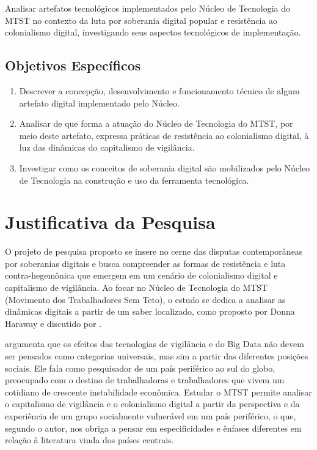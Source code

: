 Analisar artefatos tecnológicos implementados pelo Núcleo de Tecnologia do MTST no contexto da luta por soberania digital popular e resistência ao colonialismo digital, investigando seus aspectos tecnológicos de implementação.

\subsection{Objetivos Específicos}
\label{subsec:objEs}

\begin{enumerate}
    \item Descrever a concepção, desenvolvimento e funcionamento técnico de algum artefato digital implementado pelo Núcleo.
    
    \item Analisar de que forma a atuação do Núcleo de Tecnologia do MTST, por meio deste artefato, expressa práticas de resistência ao colonialismo digital, à luz das dinâmicas do capitalismo de vigilância.

    \item Investigar como os conceitos de soberania digital são mobilizados pelo Núcleo de Tecnologia na construção e uso da ferramenta tecnológica.
    
\end{enumerate}

\section{Justificativa da Pesquisa}
\label{sec:just}

O projeto de pesquisa proposto se insere no cerne das disputas contemporâneas por soberanias digitais e busca compreender as formas de resistência e luta contra-hegemônica que emergem em um cenário de colonialismo digital e capitalismo de vigilância. Ao focar no Núcleo de Tecnologia do MTST (Movimento dos Trabalhadores Sem Teto), o estudo se dedica a analisar as dinâmicas digitais a partir de um saber localizado, como proposto por Donna Haraway e discutido por .

 argumenta que os efeitos das tecnologias de vigilância e do Big Data não devem ser pensados como categorias universais, mas sim a partir das diferentes posições sociais. Ele fala como pesquisador de um país periférico ao sul do globo, preocupado com o destino de trabalhadoras e trabalhadores que vivem um cotidiano de crescente instabilidade econômica. Estudar o MTST permite analisar o capitalismo de vigilância e o colonialismo digital a partir da perspectiva e da experiência de um grupo socialmente vulnerável em um país periférico, o que, segundo o autor, nos obriga a pensar em especificidades e ênfases diferentes em relação à literatura vinda dos países centrais.

